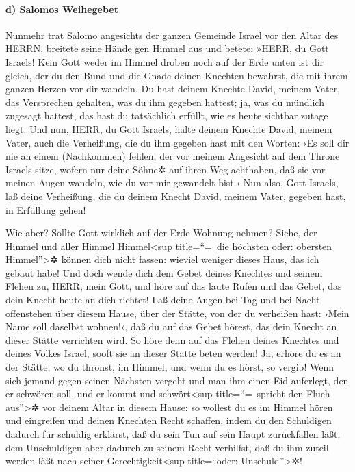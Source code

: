 \hypertarget{d-salomos-weihegebet}{%
\paragraph{d) Salomos Weihegebet}\label{d-salomos-weihegebet}}

Nunmehr trat Salomo angesichts der ganzen Gemeinde Israel
vor den Altar des HERRN, breitete seine Hände gen Himmel aus
und betete: »HERR, du Gott Israels! Kein Gott weder im
Himmel droben noch auf der Erde unten ist dir gleich, der du den Bund
und die Gnade deinen Knechten bewahrst, die mit ihrem ganzen Herzen vor
dir wandeln. Du hast deinem Knechte David, meinem Vater,
das Versprechen gehalten, was du ihm gegeben hattest; ja, was du
mündlich zugesagt hattest, das hast du tatsächlich erfüllt, wie es heute
sichtbar zutage liegt. Und nun, HERR, du Gott Israels,
halte deinem Knechte David, meinem Vater, auch die Verheißung, die du
ihm gegeben hast mit den Worten: ›Es soll dir nie an einem (Nachkommen)
fehlen, der vor meinem Angesicht auf dem Throne Israels sitze, wofern
nur deine Söhne✲ auf ihren Weg achthaben, daß sie vor meinen Augen
wandeln, wie du vor mir gewandelt bist.‹ Nun also, Gott
Israels, laß deine Verheißung, die du deinem Knecht David, meinem Vater,
gegeben hast, in Erfüllung gehen!

Wie aber? Sollte Gott wirklich auf der Erde Wohnung
nehmen? Siehe, der Himmel und aller Himmel Himmel\textless sup
title=``=~die höchsten oder: obersten Himmel''\textgreater✲ können dich
nicht fassen: wieviel weniger dieses Haus, das ich gebaut habe!
Und doch wende dich dem Gebet deines Knechtes und seinem
Flehen zu, HERR, mein Gott, und höre auf das laute Rufen und das Gebet,
das dein Knecht heute an dich richtet! Laß deine Augen
bei Tag und bei Nacht offenstehen über diesem Hause, über der Stätte,
von der du verheißen hast: ›Mein Name soll daselbst wohnen!‹, daß du auf
das Gebet hörest, das dein Knecht an dieser Stätte verrichten wird.
So höre denn auf das Flehen deines Knechtes und deines
Volkes Israel, sooft sie an dieser Stätte beten werden! Ja, erhöre du es
an der Stätte, wo du thronst, im Himmel, und wenn du es hörst, so
vergib! Wenn sich jemand gegen seinen Nächsten vergeht
und man ihm einen Eid auferlegt, den er schwören soll, und er kommt und
schwört\textless sup title=``=~spricht den Fluch aus''\textgreater✲ vor
deinem Altar in diesem Hause: so wollest du es im Himmel
hören und eingreifen und deinen Knechten Recht schaffen, indem du den
Schuldigen dadurch für schuldig erklärst, daß du sein Tun auf sein Haupt
zurückfallen läßt, dem Unschuldigen aber dadurch zu seinem Recht
verhilfst, daß du ihm zuteil werden läßt nach seiner
Gerechtigkeit\textless sup title=``oder: Unschuld''\textgreater✲!

